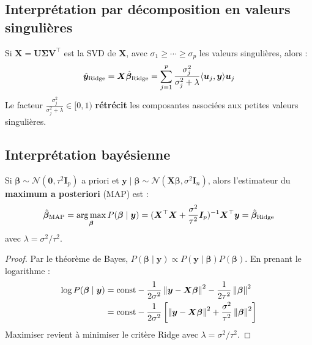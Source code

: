 \subsection{Interpr\'etation par d\'ecomposition en valeurs singuli\`eres}

\begin{proposition}
\label{prop:ridge-svd}
Si $\bm{X} = \bm{U}\bm{\Sigma}\bm{V}^\top$ est la SVD de $\bm{X}$, avec
$\sigma_1 \geq \cdots \geq \sigma_p$ les valeurs singuli\`eres, alors :
\[
  \hat{\bm{y}}_{\text{Ridge}} = \bm{X}\hat{\bm{\beta}}_{\text{Ridge}}
  = \sum_{j=1}^{p} \frac{\sigma_j^2}{\sigma_j^2 + \lambda} \langle \bm{u}_j, \bm{y} \rangle \bm{u}_j
\]
Le facteur $\frac{\sigma_j^2}{\sigma_j^2 + \lambda} \in [0, 1)$ \textbf{r\'etr\'ecit}
les composantes associ\'ees aux petites valeurs singuli\`eres.
\end{proposition}

\subsection{Interpr\'etation bay\'esienne}

\begin{theoreme}
Si $\bm{\beta} \sim \mathcal{N}(\bm{0}, \tau^2 \bm{I}_p)$ a priori et
$\bm{y} \mid \bm{\beta} \sim \mathcal{N}(\bm{X}\bm{\beta}, \sigma^2 \bm{I}_n)$,
alors l'estimateur du \textbf{maximum a posteriori} (MAP) est :
\[
  \hat{\bm{\beta}}_{\text{MAP}} = \operatorname*{arg\,max}_{\bm{\beta}} P(\bm{\beta} \mid \bm{y})
  = (\bm{X}^\top \bm{X} + \frac{\sigma^2}{\tau^2}\bm{I}_p)^{-1}\bm{X}^\top \bm{y}
  = \hat{\bm{\beta}}_{\text{Ridge}}
\]
avec $\lambda = \sigma^2 / \tau^2$.
\end{theoreme}

\begin{proof}
Par le th\'eor\`eme de Bayes, $P(\bm{\beta} \mid \bm{y}) \propto P(\bm{y} \mid \bm{\beta})P(\bm{\beta})$.
En prenant le logarithme :
\begin{align*}
  \log P(\bm{\beta} \mid \bm{y})
  &= \text{const} - \frac{1}{2\sigma^2}\left\| \bm{y} - \bm{X}\bm{\beta} \right\|^2
     - \frac{1}{2\tau^2}\left\| \bm{\beta} \right\|^2 \\
  &= \text{const} - \frac{1}{2\sigma^2}\left[
     \left\| \bm{y} - \bm{X}\bm{\beta} \right\|^2 + \frac{\sigma^2}{\tau^2}\left\| \bm{\beta} \right\|^2
  \right]
\end{align*}
Maximiser revient \`a minimiser le crit\`ere Ridge avec $\lambda = \sigma^2/\tau^2$.
\end{proof}

